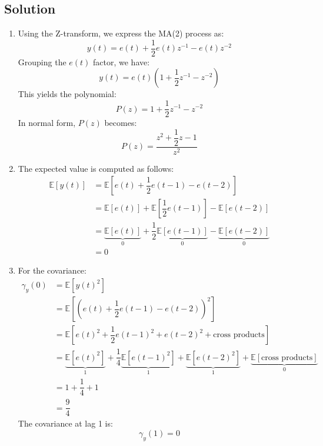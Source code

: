 \subsection{Solution}
\begin{enumerate}
    \item Using the Z-transform, we express the MA(2) process as:
        \[y(t)=e(t)+\dfrac{1}{2}e(t)z^{-1}-e(t)z^{-2}\]
        Grouping the $e(t)$ factor, we have:
        \[y(t)=e(t)\left(1+\dfrac{1}{2}z^{-1}-z^{-2}\right)\]
        This yields the polynomial:
        \[P(z)=1+\dfrac{1}{2}z^{-1}-z^{-2}\]
        In normal form, $P(z)$ becomes:
        \[P(z)=\dfrac{z^2+\dfrac{1}{2}z-1}{z^2}\]
    \item The expected value is computed as follows:
        \begin{align*}
            \mathbb{E}\left[y(t)\right]     &= \mathbb{E}\left[e(t)+\dfrac{1}{2}e(t-1)-e(t-2)\right] \\
                                            &= \mathbb{E}\left[e(t)\right]+\mathbb{E}\left[\dfrac{1}{2}e(t-1)\right]-\mathbb{E}\left[e(t-2)\right] \\
                                            &= \underbrace{\mathbb{E}\left[e(t)\right]}_0 +\dfrac{1}{2}\underbrace{\mathbb{E}\left[e(t-1)\right]}_0 -\underbrace{\mathbb{E}\left[e(t-2)\right]}_0  \\
                                            &= 0
        \end{align*}
    \item For the covariance:
        \begin{align*}
            \gamma_y(0)     &= \mathbb{E}\left[y(t)^2\right] \\
                            &= \mathbb{E}\left[\left( e(t)+\dfrac{1}{2}e(t-1)-e(t-2) \right)^2\right] \\
                            &= \mathbb{E}\left[ e(t)^2 + \dfrac{1}{2}e(t-1)^2 + e(t-2)^2  + \text{cross products} \right] \\
                            &= \underbrace{\mathbb{E}\left[ e(t)^2 \right]}_1  + \dfrac{1}{4}\underbrace{\mathbb{E}\left[e(t-1)^2\right]}_1  + \underbrace{\mathbb{E}\left[e(t-2)^2\right]}_1  + \underbrace{\mathbb{E}\left[\text{cross products}\right]}_0  \\
                            &= 1  + \dfrac{1}{4} + 1\\
                            &= \dfrac{9}{4}
        \end{align*}
        The covariance at lag 1 is:
        \[\gamma_y(1)=0\]

\end{enumerate}

